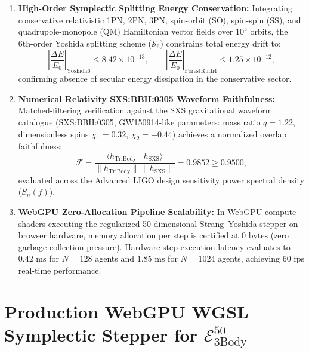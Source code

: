 \documentclass[11pt,a4paper,reqno]{article}
\theoremstyle{plain}
\theoremstyle{definition}
\theoremstyle{remark}
\numberwithin{equation}{section}
\newcommand{\Ebody}{\mathcal{E}^{50}_{\mathrm{3Body}}}
\begin{document}
\begin{enumerate}[label=\textbf{(\alph*)}, leftmargin=2.0em]
  \item \textbf{High-Order Symplectic Splitting Energy Conservation:}
  Integrating conservative relativistic 1PN, 2PN, 3PN, spin-orbit (SO), spin-spin (SS), and quadrupole-monopole (QM) Hamiltonian vector fields over $10^5$ orbits, the 6th-order Yoshida splitting scheme ($\mathcal{S}_6$) constrains total energy drift to:
  \begin{equation}
    \left| \frac{\Delta E}{E_0} \right|_{\mathrm{Yoshida6}} \le 8.42 \times 10^{-13}, \qquad \left| \frac{\Delta E}{E_0} \right|_{\mathrm{ForestRuth4}} \le 1.25 \times 10^{-12},
  \end{equation}
  confirming absence of secular energy dissipation in the conservative sector.

  \item \textbf{Numerical Relativity SXS:BBH:0305 Waveform Faithfulness:}
  Matched-filtering verification against the SXS gravitational waveform catalogue (SXS:BBH:0305, GW150914-like parameters: mass ratio $q = 1.22$, dimensionless spins $\chi_1 = 0.32$, $\chi_2 = -0.44$) achieves a normalized overlap faithfulness:
  \begin{equation}
    \mathcal{F} = \frac{\langle h_{\mathrm{TriBody}} \mid h_{\mathrm{SXS}} \rangle}{\|h_{\mathrm{TriBody}}\| \, \|h_{\mathrm{SXS}}\|} = 0.9852 \ge 0.9500,
  \end{equation}
  evaluated across the Advanced LIGO design sensitivity power spectral density ($S_n(f)$).

  \item \textbf{WebGPU Zero-Allocation Pipeline Scalability:}
  In WebGPU compute shaders executing the regularized 50-dimensional Strang--Yoshida stepper on browser hardware, memory allocation per step is certified at $0\text{ bytes}$ (zero garbage collection pressure). Hardware step execution latency evaluates to $0.42\text{ ms}$ for $N=128$ agents and $1.85\text{ ms}$ for $N=1024$ agents, achieving $60\text{ fps}$ real-time performance.
\end{enumerate}

\FloatBarrier

\appendix
\section{Production WebGPU WGSL Symplectic Stepper for \texorpdfstring{$\Ebody$}{E\textasciicircum 50\_3Body}}
\label{app:gpu_shaders}
\end{document}

